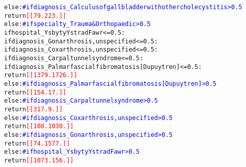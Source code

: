 \documentclass[thesis.tex]{subfiles}
\begin{document}
{\begin{alltt}
                else:  \textcolor{blue}{# if diagnosis_Calculus of gallbladder with other cholecystitis > 0.5}
                    return \textcolor{red}{[[ 79. 223.]]}
        else:  \textcolor{blue}{# if specialty_Trauma & Orthopaedic > 0.5}
            if hospital_Ysbyty Ystrad Fawr <= 0.5:
                if diagnosis_Gonarthrosis, unspecified <= 0.5:
                    if diagnosis_Coxarthrosis, unspecified <= 0.5:
                        if diagnosis_Carpal tunnel syndrome <= 0.5:
                            if diagnosis_Palmar fascial fibromatosis [Dupuytren] <= 0.5:
                                return \textcolor{red}{[[1379. 1726.]]}
                            else:  \textcolor{blue}{# if diagnosis_Palmar fascial fibromatosis [Dupuytren] > 0.5}
                                return \textcolor{red}{[[154.  17.]]}
                        else:  \textcolor{blue}{# if diagnosis_Carpal tunnel syndrome > 0.5}
                            return \textcolor{red}{[[317.   9.]]}
                    else:  \textcolor{blue}{# if diagnosis_Coxarthrosis, unspecified > 0.5}
                        return \textcolor{red}{[[ 108. 1030.]]}
                else:  \textcolor{blue}{# if diagnosis_Gonarthrosis, unspecified > 0.5}
                    return \textcolor{red}{[[  74. 1577.]]}
            else:  \textcolor{blue}{# if hospital_Ysbyty Ystrad Fawr > 0.5}
                return \textcolor{red}{[[1073.  156.]]}
\end{alltt}
}
\end{document}
